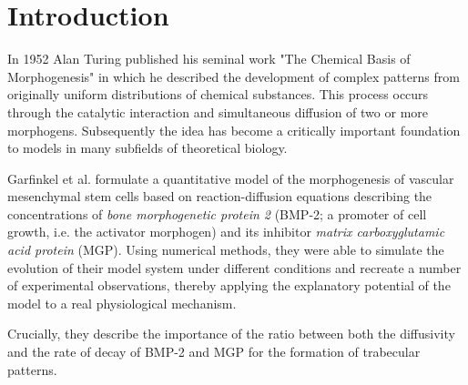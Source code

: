 \documentclass{article}
\begin{document}
	\section{Introduction}
	
	In 1952 Alan Turing published his seminal work "The Chemical Basis of Morphogenesis" in which he described the development of complex patterns from originally uniform distributions of chemical substances. This process occurs through the catalytic interaction and simultaneous diffusion of two or more morphogens. Subsequently the idea has become a critically important foundation to models in many subfields of theoretical biology.
	
	Garfinkel et al. formulate a quantitative model of the morphogenesis of vascular mesenchymal stem cells based on reaction-diffusion equations describing the concentrations of \textit{bone morphogenetic protein 2} (BMP-2; a promoter of cell growth, i.e. the activator morphogen) and its inhibitor \textit{matrix carboxyglutamic acid protein} (MGP). Using numerical methods, they were able to simulate the evolution of their model system under different conditions and recreate a number of experimental observations, thereby applying the explanatory potential of the model to a real physiological mechanism.
	
	Crucially, they describe the importance of the ratio between both the diffusivity and the rate of decay of BMP-2 and MGP for the formation of trabecular patterns.
	
	\pagebreak
	
\end{document}
